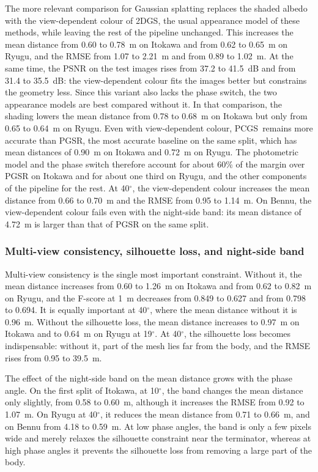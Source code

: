 \documentclass[fleqn,usenatbib]{aa}
\newcommand{\pcgs}{PCGS}
\begin{document}
The more relevant comparison for Gaussian splatting replaces the shaded albedo with the view-dependent colour of 2DGS,
the usual appearance model of these methods, while leaving the rest of the pipeline unchanged. This increases the mean
distance from 0.60 to 0.78~m on Itokawa and from 0.62 to 0.65~m on Ryugu, and the RMSE from 1.07 to 2.21~m and from
0.89 to 1.02~m. At the same time, the PSNR on the test images rises from 37.2 to 41.5~dB and from 31.4 to 35.5~dB: the
view-dependent colour fits the images better but constrains the geometry less. Since this variant also lacks the phase switch, the two appearance models are best compared without it. In that
comparison, the shading lowers the mean distance
from 0.78 to 0.68~m on Itokawa but only from 0.65 to 0.64~m on Ryugu. Even with view-dependent colour, \pcgs\ remains more accurate than PGSR, the most accurate baseline on the same split, which has mean distances of
0.90~m on Itokawa and 0.72~m on Ryugu. The photometric model and the phase switch therefore account for about 60\% of the margin over PGSR on Itokawa
and for about one third on Ryugu, and the other components of the pipeline for the rest. At 40$^\circ$, the
view-dependent colour increases the mean distance from 0.66 to 0.70~m and the RMSE from 0.95 to 1.14~m. On Bennu, the view-dependent colour fails even with the night-side band: its mean distance of 4.72~m is larger than
that of PGSR on the same split.

\subsubsection{Multi-view consistency, silhouette loss, and night-side band}

Multi-view consistency is the single most important constraint. Without it, the mean distance increases from 0.60 to
1.26~m on Itokawa and from 0.62 to 0.82~m on Ryugu, and the F-score at 1~m decreases from 0.849 to 0.627 and from
0.798 to 0.694. It is equally important at 40$^\circ$, where the mean distance without it is 0.96~m. Without the silhouette
loss, the mean distance increases to 0.97~m on Itokawa and to 0.64~m on Ryugu at 19$^\circ$. At 40$^\circ$, the
silhouette loss becomes indispensable: without it, part of the mesh lies far from the body, and the RMSE rises from
0.95 to 39.5~m.

The effect of the night-side band on the mean distance grows with the phase angle. On the first split of Itokawa, at
10$^\circ$, the band changes the mean distance only slightly, from 0.58 to 0.60~m, although it increases the RMSE from 0.92 to
1.07~m. On Ryugu at 40$^\circ$, it reduces the mean distance from 0.71 to 0.66~m, and on Bennu from 4.18 to 0.59~m. At
low phase angles, the band is only a few pixels wide and merely relaxes the silhouette constraint near the terminator,
whereas at high phase angles it prevents the silhouette loss from removing a large part of the body.
\end{document}
